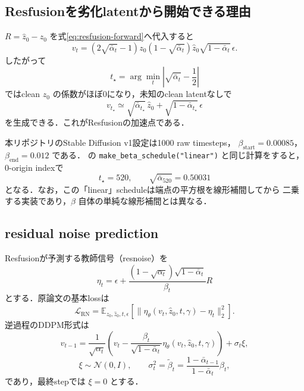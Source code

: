 \documentclass[11pt,a4paper]{ltjsarticle}
\newcommand{\E}{\mathbb{E}}
\newcommand{\N}{\mathcal{N}}
\begin{document}
\subsection{Resfusionを劣化latentから開始できる理由}

\(R=\hat z_0-z_0\) を式\eqref{eq:resfusion-forward}へ代入すると
\begin{equation}
  v_t
  =
  (2\sqrt{\bar\alpha_t}-1)z_0
  (1-\sqrt{\bar\alpha_t})\hat z_0
  \sqrt{1-\bar\alpha_t}\,\epsilon .
\label{eq:smooth-equivalence}
\end{equation}
したがって
\[
  t_\star
  =
  \arg\min_t
  \left|\sqrt{\bar\alpha_t}-\frac12\right|
\]
ではclean \(z_0\) の係数がほぼ0になり，未知のclean latentなしで
\begin{equation}
  v_{t_\star}
  \simeq
  \sqrt{\bar\alpha_{t_\star}}\,\hat z_0
  +
  \sqrt{1-\bar\alpha_{t_\star}}\,\epsilon
\label{eq:resfusion-init}
\end{equation}
を生成できる．これがResfusionの加速点である．

本リポジトリのStable Diffusion v1設定は1000 raw timesteps，
\(\beta_{\mathrm{start}}=0.00085\)，
\(\beta_{\mathrm{end}}=0.012\) である．
 の
\texttt{make\_beta\_schedule("linear")} と同じ計算をすると，
0-origin indexで
\[
  t_\star=520,\qquad
  \sqrt{\bar\alpha_{520}}=0.50031
\]
となる．なお，この「linear」scheduleは端点の平方根を線形補間してから
二乗する実装であり，\(\beta\) 自体の単純な線形補間とは異なる．

\subsection{residual noise prediction}

Resfusionが予測する教師信号（resnoise）を
\begin{equation}
  \eta_t
  =
  \epsilon
  +
  \frac{(1-\sqrt{\alpha_t})\sqrt{1-\bar\alpha_t}}
       {\beta_t}R
\label{eq:resnoise}
\end{equation}
とする．原論文の基本lossは
\begin{equation}
  \mathcal L_{\mathrm{RN}}
  =
  \E_{z_0,\hat z_0,t,\epsilon}
  \left[
    \lVert
      \eta_\theta(v_t,\hat z_0,t,\gamma)-\eta_t
    \rVert_2^2
  \right].
\label{eq:resnoise-loss}
\end{equation}
逆過程のDDPM形式\cite{ddpm}は
\begin{equation}
  v_{t-1}
  =
  \frac{1}{\sqrt{\alpha_t}}
  \left(
    v_t
    -
    \frac{\beta_t}{\sqrt{1-\bar\alpha_t}}
    \eta_\theta(v_t,\hat z_0,t,\gamma)
  \right)
  +
  \sigma_t\xi,
\label{eq:resfusion-reverse}
\end{equation}
\[
  \xi\sim\N(0,I),\qquad
  \sigma_t^2=\tilde\beta_t
  =
  \frac{1-\bar\alpha_{t-1}}{1-\bar\alpha_t}\beta_t,
\]
であり，最終stepでは \(\xi=0\) とする．
\end{document}
